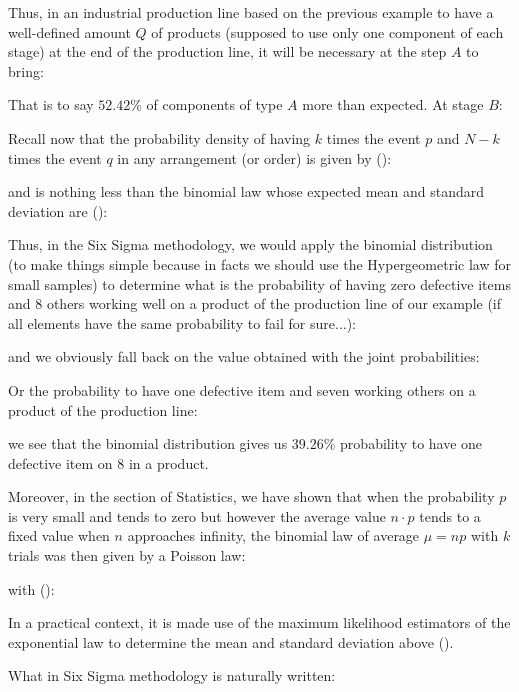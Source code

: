 Thus, in an industrial production line based on the previous example to have a well-defined amount $Q$ of products (supposed to use only one component of each stage) at the end of the production line, it will be necessary at the step $A$ to bring:

	
That is to say $52.42\%$ of components of type $A$ more than expected. At stage $B$:
	

Recall now that the probability density of having $k$ times the event $p$ and $N-k$ times the event $q$ in any arrangement (or order) is given by ():
	
and is nothing less than the binomial law whose expected mean and standard deviation are ():
	
Thus, in the Six Sigma methodology, we would apply the binomial distribution (to make things simple because in facts we should use the Hypergeometric law for small samples) to determine what is the probability of having zero defective items and $8$ others  working well on a product of the production line of our example (if all elements have the same probability to fail for sure...):
	
and we obviously fall back on the value obtained with the joint probabilities:
	
Or the probability to have one defective item and seven working others on a product of the production line:
	
we see that the binomial distribution gives us $39.26\%$ probability to have one defective item on $8$ in a product.	

Moreover, in the section of Statistics, we have shown that when the probability $p$ is very small and tends to zero but however the average value $n\cdot p$ tends to a fixed value when $n$ approaches infinity, the binomial law of average $\mu=np$ with $k$ trials was then given by a Poisson law:
	
with ():
	
	\begin{tcolorbox}[title=Remark,colframe=black,arc=10pt]
In a practical context, it is made use of the maximum likelihood estimators of the exponential law to determine the mean and standard deviation above ().
	\end{tcolorbox}
What in Six Sigma methodology is naturally written:
	
